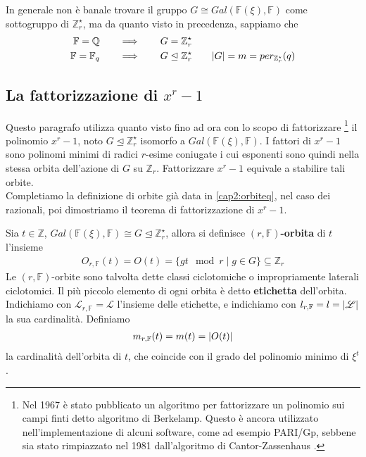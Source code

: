 In generale non è banale trovare il gruppo $G \cong Gal(\mathbb{F}(\xi), \mathbb{F})$ come sottogruppo di $\mathbb{Z}_{r}^{\star}$, ma da quanto visto in precedenza, sappiamo che 
\begin{align*}
   \mathbb{F} = \mathbb{Q} \qquad &\Longrightarrow \qquad G = \mathbb{Z}_{r}^{\star} \\
   \mathbb{F} = \mathbb{F}_{q} \qquad  &\Longrightarrow \qquad G \trianglelefteq \mathbb{Z}_{r}^{\star} 
      \qquad \arrowvert G \arrowvert = m = per_{\mathbb{Z}_{r}^{\star}}(q)
\end{align*}

\subsection{La fattorizzazione di $x^r - 1$} \label{cap2:fattorizzazione}
Questo paragrafo utilizza quanto visto fino ad ora con lo scopo di fattorizzare
\footnote{Nel 1967 è stato pubblicato un algoritmo per fattorizzare un polinomio sui campi finti detto algoritmo di Berkelamp\cite{berkelamp}. Questo è ancora utilizzato nell'implementazione di alcuni software, come ad esempio PARI/Gp, sebbene sia stato rimpiazzato nel 1981 dall'algoritmo di Cantor-Zassenhaus \cite{cantor}.}
il polinomio $x^r - 1$, noto $G \trianglelefteq \mathbb{Z}_{r}^{\star}$ isomorfo a $Gal(\mathbb{F}(\xi), \mathbb{F})$. 
I fattori di $x^r - 1$ sono polinomi minimi di radici $r$-esime coniugate i cui esponenti sono quindi nella stessa orbita dell'azione di $G$ su $\mathbb{Z}_{r}$. Fattorizzare $x^r-1$ equivale a stabilire tali orbite.\\
Completiamo la definizione di orbite già data in \ref{cap2:orbiteq}, nel caso dei razionali, poi dimostriamo il teorema di fattorizzazione di $x^r - 1$. 
\begin{definizione}
Sia $t\in \mathbb{Z}$, $Gal(\mathbb{F}(\xi), \mathbb{F}) \cong G \trianglelefteq \mathbb{Z}_{r}^{\star}$, allora si definisce {\bf $(r,\mathbb{F})$-orbita} di $t$ l'insieme
\begin{align*}
   O_{r,\mathbb{F}}(t) = O(t) = \lbrace gt \mod{r} \mid g \in G \rbrace \subseteq  \mathbb{Z}_{r}
\end{align*}
Le $(r,\mathbb{F})$-orbite sono talvolta dette classi ciclotomiche o impropriamente laterali ciclotomici. Il più piccolo elemento di ogni orbita è detto {\bf etichetta} dell'orbita. \\
Indichiamo con $\mathscr{L}_{r,\mathbb{F}} = \mathscr{L}$ l'insieme delle etichette, e indichiamo con $l_{r,\mathbb{F}} = l = \arrowvert \mathscr{L} \arrowvert$ la sua cardinalità.
Definiamo
\begin{align*}
   m_{r,\mathbb{F}}(t) = m(t) = \arrowvert O(t) \arrowvert
\end{align*}
la cardinalità dell'orbita di $t$, che coincide con il grado del polinomio minimo di $\xi^{t}$.
\end{definizione}

